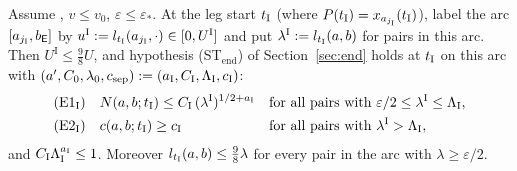 \begin{proposition}\label{prop:T2-I}
Assume \MHT, $v\le v_0$, $\varepsilon\le\varepsilon_*$. At the leg start $t_{\mathrm I}$ (where $P(t_{\mathrm I})=x_{a_{j_{\mathrm I}}}(t_{\mathrm I})$), label the arc
$[a_{j_{\mathrm I}},b_{\mathsf E}]$ by $u^{\mathrm I}:=l_{t_{\mathrm I}}(a_{j_{\mathrm I}},\cdot)\in[0,U^{\mathrm I}]$ and put $\lambda^{\mathrm I}:=l_{t_{\mathrm I}}(a,b)$ for pairs in this
arc. Then $U^{\mathrm I}\le\frac98U$, and hypothesis \textup{(ST$_{\mathrm{end}}$)} of Section~\ref{sec:end} holds at $t_{\mathrm I}$ on
this arc with $(a',C_0,\lambda_0,c_{\mathrm{sep}}):=(a_{\mathrm I},C_{\mathrm I},\Lambda_{\mathrm I},c_{\mathrm I})$:
\begin{align*}
&\textup{(E1$_{\mathrm I}$)}\quad N(a,b;t_{\mathrm I})\le C_{\mathrm I}\,(\lambda^{\mathrm I})^{1/2+a_{\mathrm I}}&&\text{for all pairs with }\varepsilon/2\le\lambda^{\mathrm I}\le\Lambda_{\mathrm I},\\
&\textup{(E2$_{\mathrm I}$)}\quad c(a,b;t_{\mathrm I})\ge c_{\mathrm I}&&\text{for all pairs with }\lambda^{\mathrm I}>\Lambda_{\mathrm I},
\end{align*}
and $C_{\mathrm I}\Lambda_{\mathrm I}^{a_{\mathrm I}}\le1$. Moreover $l_{t_{\mathrm I}}(a,b)\le\frac98\lambda$ for every pair in the arc with $\lambda\ge\varepsilon/2$.
\end{proposition}
